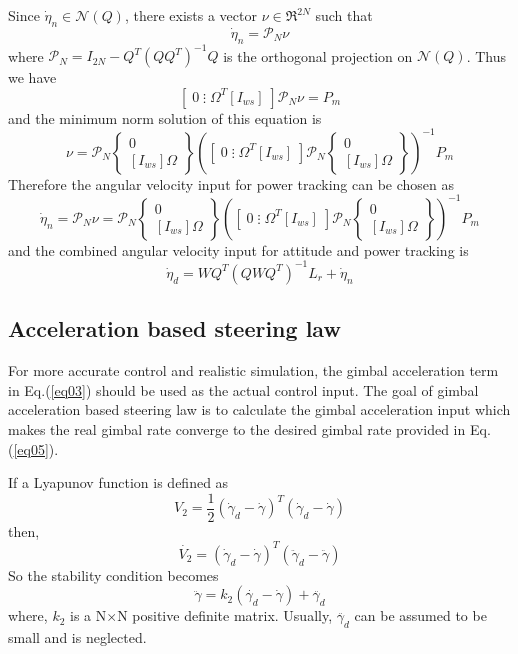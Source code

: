 \documentclass[12pt]{article}
\newcommand{\beq}{\begin{equation}}
\newcommand{\eeq}{\end{equation}}
\begin{document}
Since $\dot{\eta}_n \in \mathcal{N}(Q)$, there exists a vector
$\nu \in \Re^{2N}$ such that \cite{tsiotras1}
\beq
\dot{\eta}_n = \mathcal{P}_N \nu
\eeq
where $\mathcal{P}_N = I_{2N} - Q^T(QQ^T)^{-1} Q $ is the
orthogonal projection on $\mathcal{N}(Q)$.
Thus we have
\beq
\left[\; 0 \; \vdots \; \Omega^T [I_{ws}] \;\right]\mathcal{P}_N
\nu = P_m
\eeq
and the minimum norm solution of this equation is
\beq
\nu =\mathcal{P}_N \left\{
\begin{array}{c} 0 \\ \left[I_{ws}\right] \Omega
\end{array} \right\}
\left(\left[\; 0 \; \vdots \; \Omega^T [I_{ws}]
\;\right]\mathcal{P}_N \left\{ \begin{array}{c} 0 \\\left[I_{ws}\right] \Omega
\end{array} \right\} \right)^{-1} P_m
\eeq
Therefore the angular velocity input for power tracking can be
chosen as
\beq
\dot{\eta}_n =\mathcal{P}_N \nu =\mathcal{P}_N \left\{
\begin{array}{c} 0 \\ \left[I_{ws}\right] \Omega
\end{array} \right\}
\left(\left[\; 0 \; \vdots \; \Omega^T [I_{ws}]
\;\right]\mathcal{P}_N \left\{ \begin{array}{c} 0 \\\left[I_{ws}\right] \Omega
\end{array} \right\} \right)^{-1} P_m
\eeq
and the combined angular velocity input for attitude and power tracking is
\beq
\dot{\eta}_d = WQ^T(QWQ^T)^{-1} L_r + \dot{\eta}_n \label{eq05}
\eeq

\subsection{Acceleration based steering law}

For more accurate control and realistic simulation, the gimbal
acceleration term in Eq.(\ref{eq03}) should be used as the actual
control input.
The goal of gimbal acceleration based steering law is to calculate the gimbal acceleration
input which makes the real gimbal rate converge to the desired
gimbal rate provided in Eq.(\ref{eq05}).

If a Lyapunov function is defined as
\beq
V_2 = \frac{1}{2} (\dot{\gamma}_d - \dot{\gamma} )^T (\dot{\gamma}_d - \dot{\gamma} )
\eeq
then,
\beq
\dot{V_2} = (\dot{\gamma}_d - \dot{\gamma} )^T (\ddot{\gamma}_d - \ddot{\gamma} )
\eeq
So the stability condition becomes
\beq
\ddot{\gamma} = k_2 (\dot{\gamma_d} - \dot{\gamma} ) +
\ddot{\gamma_d }
\eeq
where, $k_2$ is a N$\times$N positive definite matrix.
Usually, $\ddot{\gamma_d }$ can be assumed to be small and is
neglected. \cite{schaub1}
\end{document}

